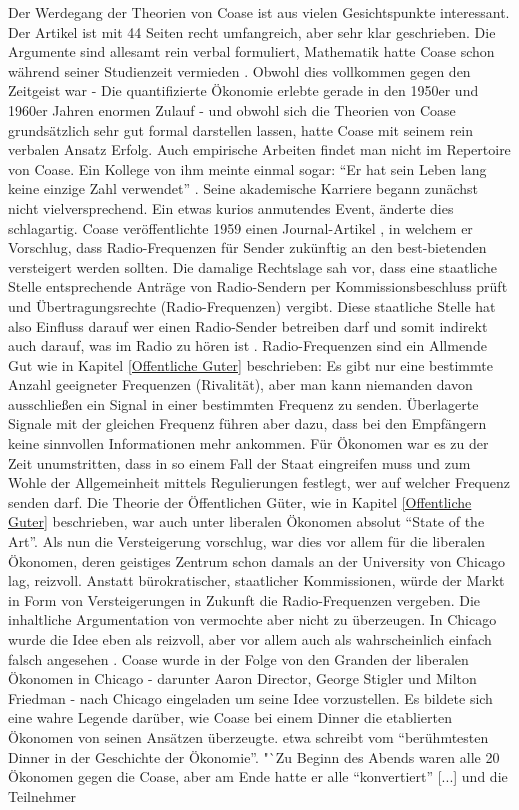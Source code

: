 Der Werdegang der Theorien von Coase ist aus vielen Gesichtspunkte interessant. Der Artikel \textcite{Coase1960} ist mit 44 Seiten recht umfangreich, aber sehr klar geschrieben. Die Argumente sind allesamt rein verbal formuliert, Mathematik hatte Coase schon während seiner Studienzeit vermieden \parencite{Coase1991a}. Obwohl dies vollkommen gegen den Zeitgeist war - Die quantifizierte Ökonomie erlebte gerade in den 1950er und 1960er Jahren enormen Zulauf - und obwohl sich die Theorien von Coase grundsätzlich sehr gut formal darstellen lassen, hatte Coase mit seinem rein verbalen Ansatz Erfolg. Auch empirische Arbeiten findet man nicht im Repertoire von Coase. Ein Kollege von ihm meinte einmal sogar: "`Er hat sein Leben lang keine einzige Zahl verwendet"' \parencite[S. 111]{Warsh}. Seine akademische Karriere begann zunächst nicht vielversprechend. Ein etwas kurios anmutendes Event, änderte dies schlagartig. Coase veröffentlichte 1959 einen Journal-Artikel \parencite{Coase1959}, in welchem er Vorschlug, dass Radio-Frequenzen für Sender zukünftig an den best-bietenden versteigert werden sollten. Die damalige Rechtslage sah vor, dass eine staatliche Stelle entsprechende Anträge von Radio-Sendern per Kommissionsbeschluss prüft und Übertragungsrechte (Radio-Frequenzen) vergibt. Diese staatliche Stelle hat also Einfluss darauf wer einen Radio-Sender betreiben darf und somit indirekt auch darauf, was im Radio zu hören ist \parencite[S. 879]{Coase1959}. Radio-Frequenzen sind ein Allmende Gut wie in Kapitel \ref{Offentliche Guter} beschrieben: Es gibt nur eine bestimmte Anzahl geeigneter Frequenzen (Rivalität), aber man kann niemanden davon ausschließen ein Signal in einer bestimmten Frequenz zu senden. Überlagerte Signale mit der gleichen Frequenz führen aber dazu, dass bei den Empfängern keine sinnvollen Informationen mehr ankommen. Für Ökonomen war es zu der Zeit unumstritten, dass in so einem Fall der Staat eingreifen muss und zum Wohle der Allgemeinheit mittels Regulierungen festlegt, wer auf welcher Frequenz senden darf. Die Theorie der Öffentlichen Güter, wie in Kapitel \ref{Offentliche Guter} beschrieben, war auch unter liberalen Ökonomen absolut "`State of the Art"'. Als \textcite{Coase1959} nun die Versteigerung vorschlug, war dies vor allem für die liberalen Ökonomen, deren geistiges Zentrum schon damals an der University von Chicago lag, reizvoll. Anstatt bürokratischer, staatlicher Kommissionen, würde der Markt in Form von Versteigerungen in Zukunft die Radio-Frequenzen vergeben. Die inhaltliche Argumentation von \textcite{Coase1959} vermochte aber nicht zu überzeugen. In Chicago wurde die Idee eben als reizvoll, aber vor allem auch als wahrscheinlich einfach falsch angesehen \parencite{Coase1991a}. Coase wurde in der Folge von den Granden der liberalen Ökonomen in Chicago - darunter Aaron Director, George Stigler und Milton Friedman - nach Chicago eingeladen um seine Idee vorzustellen. Es bildete sich eine wahre Legende \parencite[S. 113]{Warsh} darüber, wie Coase bei einem Dinner die etablierten Ökonomen von seinen Ansätzen überzeugte. \textcite[S. 45]{Schlafly2007} etwa schreibt vom "`berühmtesten Dinner in der Geschichte der Ökonomie"'. "`Zu Beginn des Abends waren alle 20 Ökonomen gegen die Coase, aber am Ende hatte er alle "`konvertiert"' [...] und die Teilnehmer 